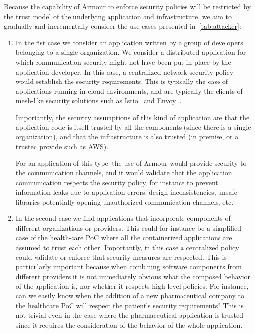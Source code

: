 \documentclass[a4paper]{article}
\newcommand{\gp}[1]{\gpnote{#1}}
\newcommand{\armour}{{\sc Armour}}
\begin{document}
Because the capability of \armour{} to enforce security policies will
be restricted by the trust model of the underlying application and
infrastructure, we aim to gradually and incrementally consider the
use-cases presented in~\autoref{tab:attacker}:
\begin{enumerate}
\item In the fist case we consider an application written by a group
  of developers belonging to a single organization.
  We consider a distributed application for which communication
  security might not have been put in place by the application
  developer.
  In this case, a centralized network security policy would establish
  the security requirements.
  This is typically the case of applications running in cloud
  environments, and are typically the clients of mesh-like security
  solutions such as Istio~\cite{istio} and Envoy~\cite{envoy}.

  Importantly, the security assumptions of this kind of application
  are that the application code is itself trusted by all the
  components (since there is a single organization), and that the
  infrastructure is also trusted (in premise, or a trusted provide
  such as AWS).

  For an application of this type, the use of \armour{} would provide
  security to the communication channels, and it would validate that
  the application communication respects the security policy, for
  instance to prevent information leaks due to application errors,
  design inconsistencies, unsafe libraries potentially opening
  unauthorized communication channels, etc.
 
\item In the second case we find applications that incorporate
  components of different organizations or providers.
  This could for instance be a simplified case of the health-care
  PoC where all the containerized applications are assumed to trust
  each other.
  Importantly, in this case a centralized policy could validate or
  enforce that security measures are respected.
  This is particularly important because when combining software
  components from different providers it is not immediately obvious
  what the composed behavior of the application is, nor whether it
  respects high-level policies.
  For instance, can we easily know when the addition of a new
  pharmaceutical company to the healthcare PoC will respect the
  patient's security requirements? This is not trivial even in the case
  where the pharmaceutical application is trusted since it requires
  the consideration of the behavior of the whole application.


\end{enumerate}
\end{document}
